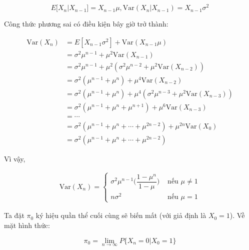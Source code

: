 \documentclass[14pt, a4paper]{article}
\numberwithin{equation}{section}
\numberwithin{figure}{section}
\theoremstyle{sltheorem}
\theoremstyle{soltheorem}
\numberwithin{dl}{section}
\numberwithin{vd}{section}
\begin{document}
    \begin{equation*}
        E \lbrack X_n \vert X_{n-1} \rbrack = X_{n-1} \mu, \mathrm{Var} (X_n \vert X_{n-1}) = X_{n-1} \sigma^2
    \end{equation*}

    Công thức phương sai có điều kiện bây giờ trở thành:

    \begin{equation*}
        \begin{aligned}
            \mathrm{Var}(X_n) & =E[X_{n-1} \sigma^2]+\mathrm{Var}(X_{n-1} \mu) \\
            &=\sigma^2 \mu^{n-1}+\mu^2 \mathrm{Var}(X_{n-1}) \\
            &=\sigma^2 \mu^{n-1}+\mu^2(\sigma^2 \mu^{n-2}+\mu^2 \mathrm{Var}(X_{n-2})) \\
            &=\sigma^2(\mu^{n-1}+\mu^n)+\mu^4 \mathrm{Var}(X_{n-2}) \\
            &=\sigma^2(\mu^{n-1}+\mu^n)+\mu^4(\sigma^2 \mu^{n-3}+\mu^2 \mathrm{Var}(X_{n-3})) \\
            &=\sigma^2(\mu^{n-1}+\mu^n+\mu^{n+1})+\mu^6 \mathrm{Var}(X_{n-3}) \\
            &=\cdots \\
            &=\sigma^2(\mu^{n-1}+\mu^n+\cdots+\mu^{2 n-2})+\mu^{2 n} \mathrm{Var}(X_0) \\
            &=\sigma^2(\mu^{n-1}+\mu^n+\cdots+\mu^{2 n-2})
        \end{aligned}
    \end{equation*}

    Vì vậy,

    \begin{equation}
        \begin{aligned}
            \mathrm{Var} (X_n) = \begin{cases}
                \sigma^2 \mu^{n-1} \Big ( \dfrac{1 - \mu^n}{1 - \mu} \Big) &\text{ nếu } \mu \neq 1 \\
                n \sigma^2 &\text{ nếu } \mu = 1
            \end{cases}
        \end{aligned}
    \end{equation}

    Ta đặt $\pi_0$ ký hiệu quần thể cuối cùng sẽ biến mất (với giả định là $X_0=1$). Về mặt hình thức:

    \begin{equation*}
        \pi_0 = \lim_{n \rightarrow \infty} P \lbrace X_n = 0 \vert X_0 = 1 \rbrace
    \end{equation*}
\end{document}
